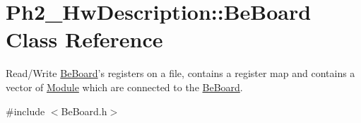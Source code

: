 \hypertarget{class_ph2___hw_description_1_1_be_board}{\section{Ph2\-\_\-\-Hw\-Description\-:\-:Be\-Board Class Reference}
\label{class_ph2___hw_description_1_1_be_board}
}


Read/\-Write \hyperlink{class_ph2___hw_description_1_1_be_board}{Be\-Board}'s registers on a file, contains a register map and contains a vector of \hyperlink{class_ph2___hw_description_1_1_module}{Module} which are connected to the \hyperlink{class_ph2___hw_description_1_1_be_board}{Be\-Board}.  




{\ttfamily \#include $<$Be\-Board.\-h$>$}

